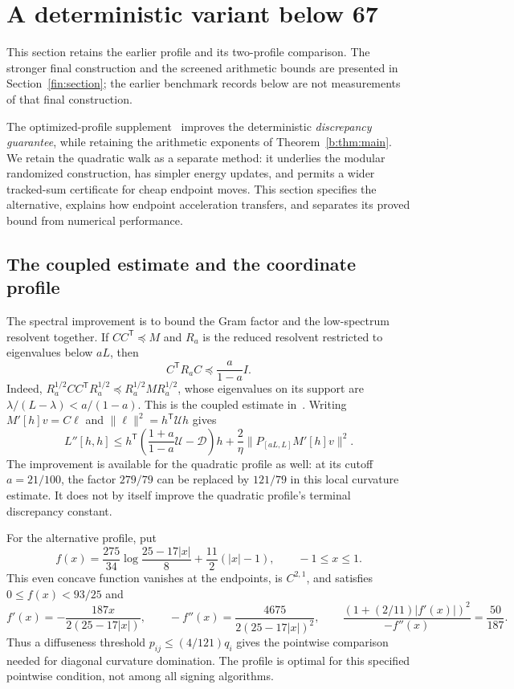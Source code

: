 \documentclass[11pt]{amsart}
\theoremstyle{definition}\newtheorem{definition}[theorem]{Definition}
\theoremstyle{remark}\newtheorem{remark}[theorem]{Remark}
\numberwithin{equation}{section}
\newcommand{\T}{\mathsf T}
\begin{document}
\section{A deterministic variant below 67}\label{opt:section}
This section retains the earlier profile and its two-profile comparison.
The stronger final construction and the screened arithmetic bounds are
presented in Section~\ref{fin:section}; the earlier benchmark records below
are not measurements of that final construction.

The optimized-profile supplement~\cite{Below67} improves the deterministic
\emph{discrepancy guarantee}, while retaining the arithmetic exponents of
Theorem~\ref{b:thm:main}. We retain the quadratic walk as a separate method:
it underlies the modular randomized construction, has simpler energy
updates, and permits a wider tracked-sum certificate for cheap endpoint
moves. This section specifies the alternative, explains how endpoint
acceleration transfers, and separates its proved bound from numerical
performance.

\subsection{The coupled estimate and the coordinate profile}
The spectral improvement is to bound the Gram factor and the low-spectrum
resolvent together. If $CC^\T\preceq M$ and $R_a$ is the reduced
resolvent restricted to eigenvalues below $aL$, then
\begin{equation}\label{opt:coupled}
 C^\T R_aC\preceq\frac{a}{1-a}I.
\end{equation}
Indeed, $R_a^{1/2}CC^\T R_a^{1/2}\preceq R_a^{1/2}MR_a^{1/2}$,
whose eigenvalues on its support are $\lambda/(L-\lambda)<a/(1-a)$.
This is the coupled estimate in~\cite[Lemma~2.4]{LiSpectral}.
Writing $M'[h]v=C\ell$ and $\|\ell\|^2=h^\T\mathcal Uh$ gives
\[
 L''[h,h]\le h^\T\left(\frac{1+a}{1-a}\mathcal U-\mathcal D\right)h
     +\frac2\eta\|P_{[aL,L]}M'[h]v\|^2.
\]
The improvement is available for the quadratic profile as well: at its
cutoff $a=21/100$, the factor $279/79$ can be replaced by $121/79$ in
this local curvature estimate. It does not by itself improve the
quadratic profile's terminal discrepancy constant.

For the alternative profile, put
\begin{equation}\label{opt:profile}
 f(x)=\frac{275}{34}\log\frac{25-17|x|}{8}
       +\frac{11}{2}(|x|-1),\qquad -1\le x\le1.
\end{equation}
This even concave function vanishes at the endpoints, is $C^{2,1}$,
and satisfies $0\le f(x)<93/25$ and
\[
 f'(x)=-\frac{187x}{2(25-17|x|)},\qquad
 -f''(x)=\frac{4675}{2(25-17|x|)^2},\qquad
 \frac{(1+(2/11)|f'(x)|)^2}{-f''(x)}=\frac{50}{187}.
\]
Thus a diffuseness threshold $p_{ij}\le(4/121)q_i$ gives the pointwise
comparison needed for diagonal curvature domination. The profile is
optimal for this specified pointwise condition, not among all signing
algorithms.
\end{document}
